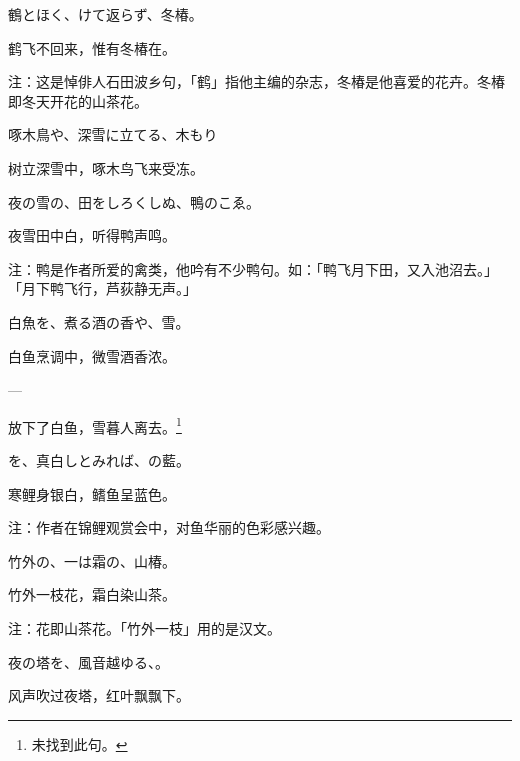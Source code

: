 \begin{haiku}
    {\FH 鶴とほく、けて返らず、冬椿。}

    {\FK 鹤飞不回来，惟有冬椿在。}

    {\FT 注：这是悼俳人石田波乡句，「鹤」指他主编的杂志，冬椿是他喜爱的花卉。冬椿即冬天开花的山茶花。}
\end{haiku}

\begin{haiku}
    {\FH 啄木鳥や、深雪に立てる、木もり}

    {\FK 树立深雪中，啄木鸟飞来受冻。}
\end{haiku}

\begin{haiku}
    {\FH 夜の雪の、田をしろくしぬ、鴨のこゑ。}

    {\FK 夜雪田中白，听得鸭声鸣。}

    {\FT 注：鸭是作者所爱的禽类，他吟有不少鸭句。如：「鸭飞月下田，又入池沼去。」 「月下鸭飞行，芦荻静无声。」}
\end{haiku}

\begin{haiku}
    {\FH 白魚を、煮る酒の香や、雪。}

    {\FK 白鱼烹调中，微雪酒香浓。}
\end{haiku}

\begin{haiku}
    {\FH ---}

    {\FK 放下了白鱼，雪暮人离去。\footnote{\FT 未找到此句。}}
\end{haiku}

\begin{haiku}
    {\FH {}を、真白しとみれば、の藍。}

    {\FK 寒鲤身银白，鳍鱼呈蓝色。}

    {\FT 注：作者在锦鲤观赏会中，对鱼华丽的色彩感兴趣。}
\end{haiku}

\begin{haiku}
    {\FH 竹外の、一は霜の、山椿。}

    {\FK 竹外一枝花，霜白染山茶。}

    {\FT 注：花即山茶花。「竹外一枝」用的是汉文。}
\end{haiku}

\begin{haiku}
    {\FH 夜の塔を、風音越ゆる、。}

    {\FK 风声吹过夜塔，红叶飘飘下。}
\end{haiku}

